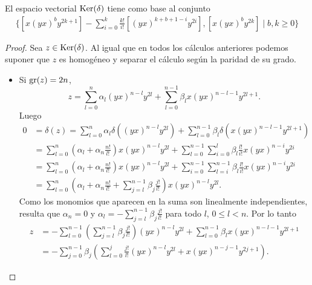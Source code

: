 \documentclass[fleqn,../tesis.tex]{subfiles}
\begin{document}
\begin{prop}
El espacio vectorial $\operatorname{Ker}(\delta)$ tiene como base al conjunto
\begin{align*}
    \Bigg\lbrace \left[x(yx)^{b}y^{2k + 1}\right] - \sum_{i = 0}^k \frac{k!}{i!}\left[(yx)^{k + b + 1 - i}y^{2i}\right],
    \left[x(yx)^{b}y^{2k}\right] \mid b, k \geq 0\Bigg\rbrace
\end{align*}
\end{prop}
\begin{proof}
    Sea $z \in \operatorname{Ker}(\delta)$. Al igual que en todos los cálculos anteriores podemos suponer que $z$ es homogéneo y separar
    el cálculo según la paridad de su grado.
    \begin{itemize}
        \item Si $\operatorname{gr}(z) = 2n$,
            \[
                z= \sum_{l = 0}^{n}\alpha_l(yx)^{n - l}y^{2l}  +\sum_{l = 0}^{n - 1}\beta_l x(yx)^{n - l - 1}y^{2l + 1}.            
            \]
         Luego
         \begin{align*}
             0 &= \delta(z) = \sum_{l = 0}^{n}\alpha_l\delta\left((yx)^{n - l}y^{2l}\right) 
                 +\sum_{l = 0}^{n - 1}\beta_l \delta\left(x(yx)^{n - l - 1}y^{2l + 1}\right)\\
             &= \sum_{l = 0}^{n}\left( \alpha_l + \alpha_n \frac{n!}{l!} \right) x(yx)^{n - l}y^{2l}
                 + \sum_{l = 0}^{n - 1}\sum_{i = 0}^{l}\beta_l \frac{l!}{i!} x(yx)^{n - i}y^{2i} \\
             &= \sum_{l = 0}^{n}\left( \alpha_l + \alpha_n \frac{n!}{l!} \right) x(yx)^{n - l}y^{2l}
                 + \sum_{i = 0}^{n - 1}\sum_{l = i}^{n - 1}\beta_l\frac{l!}{i!} x(yx)^{n - i}y^{2i} \\
             &= \sum_{l = 0}^{n}\left(\alpha_l + \alpha_n \frac{n!}{l!} + \sum_{j = l}^{n - 1}\beta_j \frac{j!}{l!}\right)x(yx)^{n - l}y^{2l}.
         \end{align*}
         Como los monomios que aparecen en la suma son linealmente independientes, resulta que $\alpha_n = 0$
         y $\alpha_l = -\sum_{j = l}^{n - 1}\beta_j \frac{j!}{l!}$ para todo $l$, $0 \leq l < n$. Por lo tanto
            \begin{align*}
                z&= -\sum_{l = 0}^{n - 1}\left(\sum_{j = l}^{n - 1}\beta_j \frac{j!}{l!}\right)(yx)^{n - l}y^{2l} 
                    +\sum_{l = 0}^{n - 1}\beta_l x(yx)^{n - l - 1}y^{2l + 1}\\
                 &= -\sum_{j = 0}^{n - 1}\beta_j \left(\sum_{l = 0} ^{j}\frac{j!}{l!}(yx)^{n -l}y^{2l} + x(yx)^{n - j - 1}y^{2j + 1}\right).

\end{align*}
\end{itemize}
\end{proof}
\end{document}
